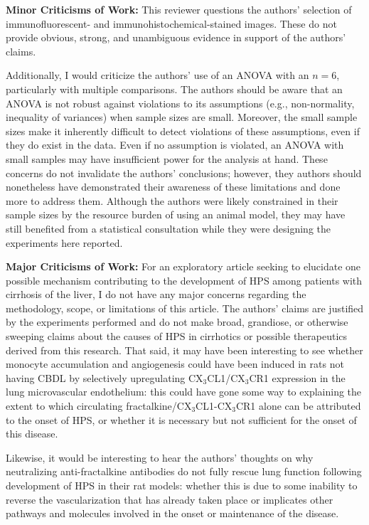 \documentclass[11pt,letterpaper,final] {article}
\begin{document}
{\bfseries Minor Criticisms of Work: } This reviewer questions the authors' selection of immunofluorescent- and immunohistochemical-stained images. These do not provide obvious, strong, and unambiguous evidence in support of the authors' claims.

Additionally, I would criticize the authors' use of an ANOVA with an $n=6$, particularly with multiple comparisons. The authors should be aware that an ANOVA is not robust against violations to its assumptions (e.g., non-normality, inequality of variances) when sample sizes are small. Moreover, the small sample sizes make it inherently difficult to detect violations of these assumptions, even if they do exist in the data. Even if no assumption is violated, an ANOVA with small samples may have insufficient power for the analysis at hand. These concerns do not invalidate the authors' conclusions; however, they authors should nonetheless have demonstrated their awareness of these limitations and done more to address them. Although the authors were likely constrained in their sample sizes by the resource burden of using an animal model, they may have still benefited from a statistical consultation while they were designing the experiments here reported.

{\bfseries Major Criticisms of Work: } For an exploratory article seeking to elucidate one possible mechanism contributing to the development of HPS among patients with cirrhosis of the liver, I do not have any major concerns regarding the methodology, scope, or limitations of this article. The authors' claims are justified by the experiments performed and do not make broad, grandiose, or otherwise sweeping claims about the causes of HPS in cirrhotics or possible therapeutics derived from this research. That said, it may have been interesting to see whether monocyte accumulation and angiogenesis could have been induced in rats not having CBDL by selectively upregulating CX$_3$CL1/CX$_3$CR1 expression in the lung microvascular endothelium: this could have gone some way to explaining the extent to which circulating fractalkine/CX$_3$CL1-CX$_3$CR1 alone can be attributed to the onset of HPS, or whether it is  necessary but not sufficient for the onset of this disease.

Likewise, it would be interesting to hear the authors' thoughts on why neutralizing anti-fractalkine antibodies do not fully rescue lung function following development of HPS in their rat models: whether this is due to some inability to reverse the vascularization that has already taken place or implicates other pathways and molecules involved in the onset or maintenance of the disease.
\end{document}
